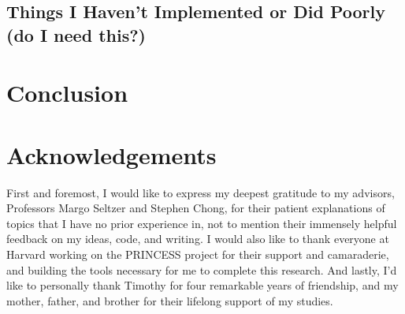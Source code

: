 \documentclass[letterpaper,12pt]{article}
\begin{document}
\subsection{Things I Haven't Implemented or Did Poorly (do I need this?)}

\section{Conclusion}

\section{Acknowledgements}
First and foremost, I would like to express my deepest gratitude to my advisors, Professors Margo Seltzer and Stephen Chong, for their patient explanations of topics that I have no prior experience in, not to mention their immensely helpful feedback on my ideas, code, and writing. I would also like to thank everyone at Harvard working on the PRINCESS project for their support and camaraderie, and building the tools necessary for me to complete this research. And lastly, I'd like to personally thank Timothy for four remarkable years of friendship, and my mother, father, and brother for their lifelong support of my studies.

{\footnotesize 
}


\end{document}
